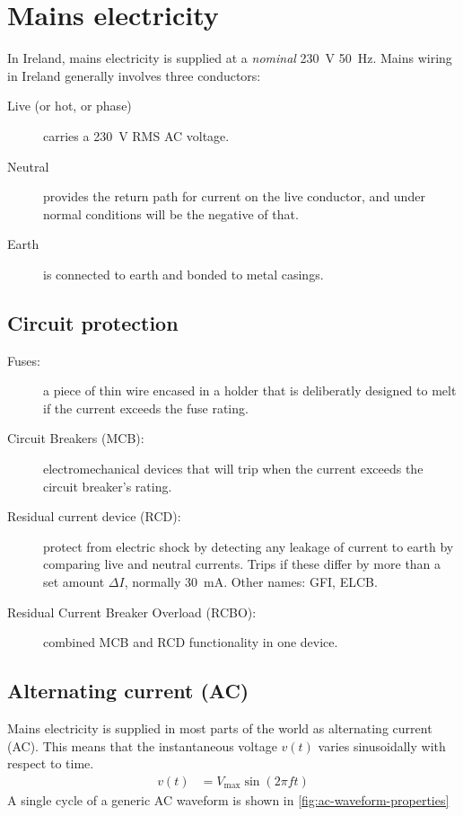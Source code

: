 \documentclass{pgnotes}
\begin{document}
\section{Mains electricity}

In Ireland, mains electricity is supplied at a \textit{nominal} \SI{230}{\volt} \SI{50}{\hertz}.
Mains wiring in Ireland generally involves three conductors:
\begin{description}
\item[Live (or hot, or phase)] carries a \SI{230}{\volt} RMS AC voltage.
\item[Neutral] provides the return path for current on the live conductor, and under normal conditions will be the negative of that.
\item[Earth] is connected to earth and bonded to metal casings.
\end{description}


\subsection{Circuit protection}

\begin{description}
\item[Fuses:] a piece of thin wire encased in a holder that is deliberatly designed to melt if the current exceeds the fuse rating.
\item[Circuit Breakers (MCB):] electromechanical devices that will trip when the current exceeds the circuit breaker's rating.
\item[Residual current device (RCD):] protect from electric shock by detecting any leakage of current to earth by comparing live and neutral currents.
  Trips if these differ by more than a set amount $\Delta I$, normally \SI{30}{\milli\ampere}.
  Other names: GFI, ELCB.
\item[Residual Current Breaker Overload (RCBO):] combined MCB and RCD functionality in one device.
\end{description}


\subsection{Alternating current (AC)}

Mains electricity is supplied in most parts of the world as alternating current (AC).
This means that the instantaneous voltage $v(t)$ varies sinusoidally with respect to time.
\begin{align}
  v(t) & = V_{\mbox{max}} \sin ( 2 \pi f t ) \label{eq:ac-instantaneous-voltage}
\end{align}
A single cycle of a generic AC waveform is shown in \autoref{fig:ac-waveform-properties}
\end{document}
